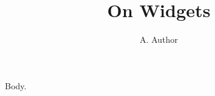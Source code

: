 \documentclass{article}
\title{On Widgets}\author{A. Author}
\begin{document}
\maketitle
Body.
\end{document}
